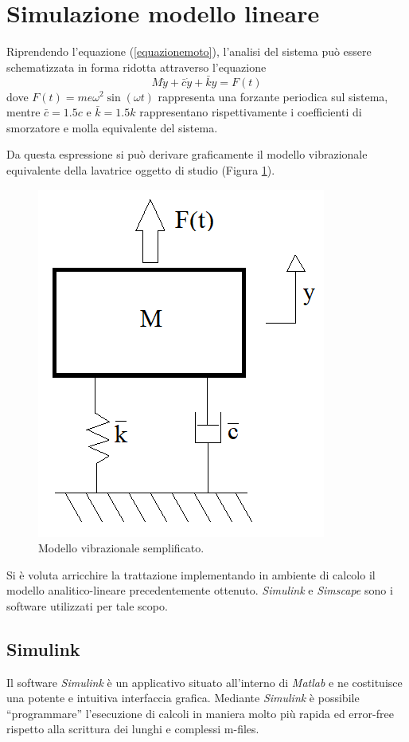\section{Simulazione modello lineare}
Riprendendo l'equazione (\ref{equazionemoto}), l'analisi del sistema può essere schematizzata in forma ridotta attraverso l'equazione 
\begin{equation}
    M\ddot y+\bar c\dot y+\bar k y=F(t)
    \label{equazionemodello}
\end{equation}
dove $F(t)=me\omega^2\sin(\omega t)$ rappresenta una forzante periodica sul sistema, mentre  $\bar c=1.5 c$ e $\bar k=1.5 k$ rappresentano rispettivamente i coefficienti di smorzatore e molla equivalente del sistema.

Da questa espressione si può derivare graficamente il modello vibrazionale equivalente della lavatrice oggetto di studio (Figura \ref{ModelloVibrazionale}). 
\begin{figure}[h]
    \centering
    \includegraphics[scale=0.7]{Massa-molla-smorzatore.png}
    \caption{Modello vibrazionale semplificato.}
    \label{ModelloVibrazionale}
\end{figure}

Si è voluta arricchire la trattazione implementando in ambiente di calcolo il modello analitico-lineare precedentemente ottenuto. \textit{Simulink} e \textit{Simscape} sono i software utilizzati per tale scopo.
\subsection{Simulink}
 Il  software  \textit{Simulink}  è  un  applicativo  situato all'interno  di \textit{Matlab} e ne costituisce una potente e intuitiva interfaccia grafica. Mediante \textit{Simulink} è possibile “programmare” l'esecuzione di calcoli in maniera molto più rapida ed error-free rispetto alla scrittura dei lunghi e complessi m-files. 
 
